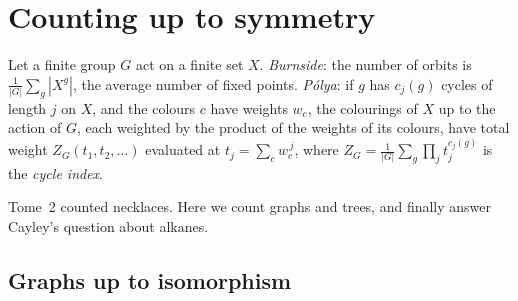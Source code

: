\section{Counting up to symmetry}\label{sec:alkanes}

\begin{reminder}
Let a finite group $G$ act on a finite set $X$. \emph{Burnside}: the number of orbits is $\frac1{|G|}\sum_g|X^g|$, the average number of
fixed points. \emph{P\'olya}: if $g$ has $c_j(g)$ cycles of length $j$ on $X$, and the colours $c$ have weights $w_c$, the colourings of $X$ up to the
action of $G$, each weighted by the product of the weights of its colours, have total weight $Z_G(t_1,t_2,\dots)$ evaluated at
$t_j=\sum_cw_c^{\,j}$, where $Z_G=\frac1{|G|}\sum_g\prod_jt_j^{c_j(g)}$ is the \emph{cycle index}.
\end{reminder}

Tome~2 counted necklaces. Here we count graphs and trees, and finally answer Cayley's question about alkanes.

\subsection*{Graphs up to isomorphism}

